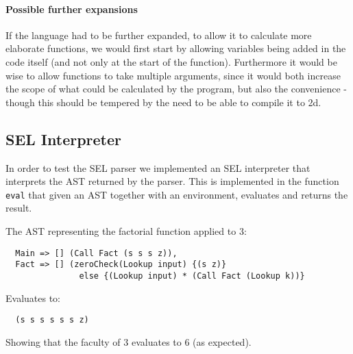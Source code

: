 \paragraph{Possible further expansions}
If the language had to be further expanded, to allow it to calculate
more elaborate functions, we would first start by allowing variables
being added in the code itself (and not only at the start of the
function). Furthermore it would be wise to allow functions to take
multiple arguments, since it would both increase the scope of what
could be calculated by the program, but also the convenience - though
this should be tempered by the need to be able to compile it to
2d.


\subsection{SEL Interpreter}
In order to test the SEL parser we implemented an SEL interpreter
that interprets the AST returned by the parser. This is implemented
in the function \texttt{eval} that given an AST together with an
environment, evaluates and returns the result.

\begin{samepage}
  \begin{exmp}
    The AST representing the factorial function applied to $3$:
\begin{verbatim}
  Main => [] (Call Fact (s s s z)),
  Fact => [] (zeroCheck(Lookup input) {(s z)}
               else {(Lookup input) * (Call Fact (Lookup k))}
\end{verbatim}
    Evaluates to:
\begin{verbatim}
  (s s s s s s z)
\end{verbatim}
    Showing that the faculty of $3$ evaluates to $6$ (as expected).
  \end{exmp}
\end{samepage}


